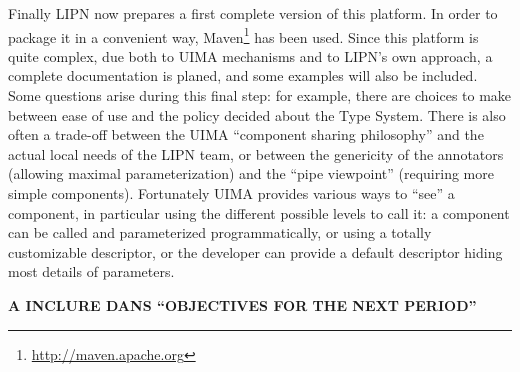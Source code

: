 Finally LIPN now prepares a first complete version of this platform. In order to package it in a convenient way, Maven\footnote{\url{http://maven.apache.org}} has been used. Since this platform is quite complex, due both to UIMA mechanisms and to LIPN's own approach, a complete documentation is planed, and some examples will also be included. Some questions arise during this final step: for example, there are choices to make between ease of use and the policy decided about the Type System. There is also often a trade-off between the UIMA ``component sharing philosophy'' and the actual local needs of the LIPN team, or between the genericity of the annotators (allowing maximal parameterization) and the ``pipe viewpoint'' (requiring more simple components). Fortunately UIMA provides various ways to ``see'' a component, in particular using the different possible levels to call it: a component can be called and parameterized programmatically, or using a totally customizable descriptor, or the developer can provide a default descriptor hiding most details of parameters.


\bigskip





{\bf A INCLURE DANS ``OBJECTIVES FOR THE NEXT PERIOD''}

